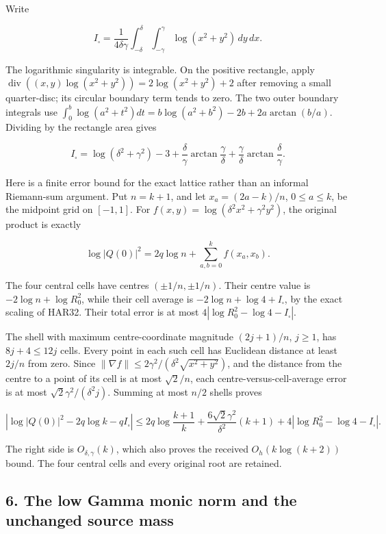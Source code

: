 \documentclass[11pt]{article}
\begin{document}
Write

\[
I_\square=\frac1{4\delta\gamma}
\int_{-\delta}^{\delta}\int_{-\gamma}^{\gamma}\log(x^2+y^2)\,dy\,dx.
\tag{HAR32}
\]

The logarithmic singularity is integrable. On the positive rectangle, apply \(\operatorname{div}((x,y)\log(x^2+y^2))=2\log(x^2+y^2)+2\) after removing a small quarter-disc; its circular boundary term tends to zero. The two outer boundary integrals use \(\int_0^b\log(a^2+t^2)dt=b\log(a^2+b^2)-2b+2a\arctan(b/a)\). Dividing by the rectangle area gives

\[
I_\square=\log(\delta^2+\gamma^2)-3
+\frac\delta\gamma\arctan\frac\gamma\delta
+\frac\gamma\delta\arctan\frac\delta\gamma.
\tag{HAR33}
\]

Here is a finite error bound for the exact lattice rather than an informal Riemann-sum argument. Put \(n=k+1\), and let \(x_a=(2a-k)/n\), \(0\le a\le k\), be the midpoint grid on \([-1,1]\). For \(f(x,y)=\log(\delta^2x^2+\gamma^2y^2)\), the original product is exactly

\[
\log|Q(0)|^2=2q\log n+\sum_{a,b=0}^k f(x_a,x_b).
\tag{HAR34}
\]

The four central cells have centres \((\pm1/n,\pm1/n)\). Their centre value is \(-2\log n+\log R_0^2\), while their cell average is \(-2\log n+\log4+I_\square\), by the exact scaling of HAR32. Their total error is at most \(4|\log R_0^2-\log4-I_\square|\).

The shell with maximum centre-coordinate magnitude \((2j+1)/n\), \(j\ge1\), has \(8j+4\le12j\) cells. Every point in each such cell has Euclidean distance at least \(2j/n\) from zero. Since \(\|\nabla f\|\le2\gamma^2/(\delta^2\sqrt{x^2+y^2})\), and the distance from the centre to a point of its cell is at most \(\sqrt2/n\), each centre-versus-cell-average error is at most \(\sqrt2\gamma^2/(\delta^2j)\). Summing at most \(n/2\) shells proves

\[
\left|\log|Q(0)|^2-2q\log k-qI_\square\right|
\le2q\log\frac{k+1}{k}
+\frac{6\sqrt2\gamma^2}{\delta^2}(k+1)
+4|\log R_0^2-\log4-I_\square|.
\tag{HAR35}
\]

The right side is \(O_{\delta,\gamma}(k)\), which also proves the received \(O_h(k\log(k+2))\) bound. The four central cells and every original root are retained.

\subsection{6. The low Gamma monic norm and the unchanged source mass}\label{the-low-gamma-monic-norm-and-the-unchanged-source-mass}
\end{document}

